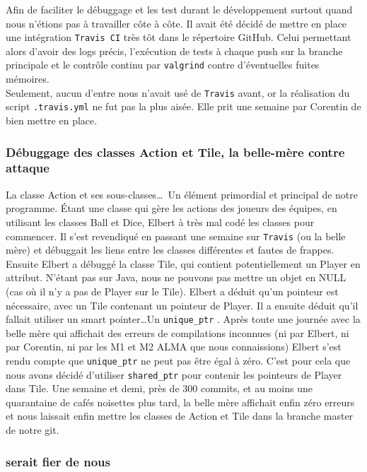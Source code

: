 \documentclass{article}
\newcommand{\info}{\texttt}
\begin{document}
            Afin de faciliter le débuggage et les test durant le développement surtout quand nous n'étions pas à travailler côte à côte. Il avait été décidé de mettre en place une intégration \info{Travis CI} très tôt dans le répertoire GitHub. Celui permettant alors d'avoir des logs précis, l'exécution de tests à chaque push sur la branche principale et le contrôle continu par \info{valgrind} contre d'éventuelles fuites mémoires.\\
            Seulement, aucun d'entre nous n'avait usé de \info{Travis} avant, or la réalisation du script \info{.travis.yml} ne fut pas la plus aisée. Elle prit une semaine par Corentin de bien mettre en place.
        
        \subsubsection{Débuggage des classes Action et Tile, la belle-mère contre attaque}
        
            La classe Action et ses sous-classes\dots\ Un élément primordial et principal de notre programme. Étant une classe qui gère les actions des joueurs des équipes, en utilisant les classes Ball et Dice, Elbert à très mal codé les classes pour commencer. Il s'est revendiqué en passant une semaine sur \info{Travis} (ou la belle mère) et débuggait les liens entre les classes différentes et fautes de frappes. Ensuite Elbert a débuggé la classe Tile, qui contient potentiellement un Player en attribut. N'étant pas sur Java, nous ne pouvons pas mettre un objet en NULL (cas où il n'y a pas de Player sur le Tile). Elbert a déduit qu'un pointeur est nécessaire, avec un Tile contenant un pointeur de Player. Il a ensuite déduit qu'il fallait utiliser un smart pointer\dots Un \info{unique\_ptr} . Après toute une journée avec la belle mère qui affichait des erreurs de compilations inconnues (ni par Elbert, ni par Corentin, ni par les M1 et M2 ALMA que nous connaissions) Elbert s'est rendu compte que \info{unique\_ptr} ne peut pas être égal à zéro. C'est pour cela que nous avons décidé d'utiliser \info{shared\_ptr} pour contenir les pointeurs de Player dans Tile. Une semaine et demi, près de 300 commits, et au moins une quarantaine de cafés noisettes plus tard, la belle mère affichait enfin zéro erreurs et nous laissait enfin mettre les classes de Action et Tile dans la branche master de notre git.
        
        \subsubsection{ serait fier de nous}
        
\end{document}
